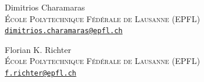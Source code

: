 \documentclass[letter,11pt]{article}
\theoremstyle{plain} %
\theoremstyle{definition} %
\theoremstyle{plain}
\theoremstyle{plain}
\theoremstyle{plain}
\numberwithin{equation}{section}
\newcommand{\1}{\mathbbm{1}}
\begin{document}

%
%






\bigskip
\bigskip
\footnotesize
\noindent
Dimitrios Charamaras\\
\textsc{{\'E}cole Polytechnique F{\'e}d{\'e}rale de Lausanne (EPFL)}\\
\href{mailto:dimitrios.charamaras@epfl.ch}
{\texttt{dimitrios.charamaras@epfl.ch}}

\bigskip
\noindent
Florian K. Richter\\
\textsc{{\'E}cole Polytechnique F{\'e}d{\'e}rale de Lausanne (EPFL)}\\
\href{mailto:f.richter@epfl.ch}
{\texttt{f.richter@epfl.ch}}

\end{document}
